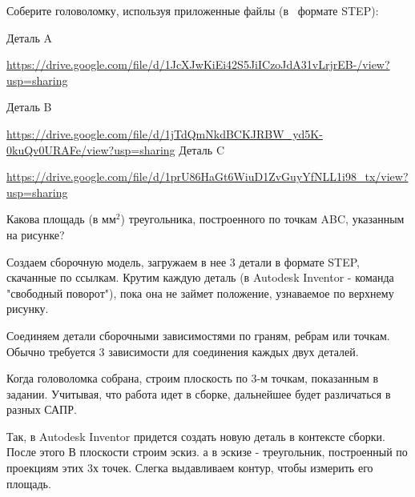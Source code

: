 
Соберите головоломку, используя приложенные файлы (в  формате STEP):

Деталь A

\url{https://drive.google.com/file/d/1JcXJwKiEi42S5JiICzoJdA31vLrjrEB-/view?usp=sharing}

Деталь B

\url{https://drive.google.com/file/d/1jTdQmNkdBCKJRBW_yd5K-0kuQv0URAFe/view?usp=sharing}
Деталь C

\url{https://drive.google.com/file/d/1prU86HaGt6WiuD1ZvGuyYfNLL1i98_tx/view?usp=sharing}


Какова площадь (в мм$^2$) треугольника, построенного по точкам ABC, указанным на рисунке?

\solutionSection

Создаем сборочную модель, загружаем в нее 3 детали в формате STEP, скачанные по ссылкам.  Крутим каждую деталь (в Autodesk Inventor - команда "свободный поворот"), пока она не займет положение, узнаваемое по верхнему рисунку.


Соединяем детали сборочными зависимостями по граням, ребрам или точкам.  Обычно требуется 3 зависимости для соединения каждых двух деталей.


Когда головоломка собрана, строим плоскость по 3-м точкам, показанным в задании.  Учитывая, что работа идет в сборке, дальнейшее будет различаться в разных САПР.  

Так, в Autodesk Inventor придется создать новую деталь в контексте сборки. После этого В плоскости строим эскиз.  а в эскизе - треугольник, построенный по проекциям этих 3х точек. Слегка выдавливаем контур, чтобы измерить его площадь.



